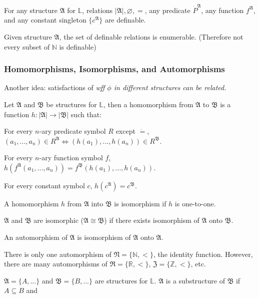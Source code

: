 \documentclass{article}
\begin{document}
	For any structure $\mathfrak{A}$ for $\mathbb{L}$, relations $|\mathfrak{A}|, \varnothing, =$, any predicate $\dot P^{\mathfrak{A}}$, any function $f^{\mathfrak{A}}$, and any constant singleton $\{c^{\mathfrak{A}}\}$ are definable.

\Lemma {} Given structure $\mathfrak{A}$, the set of definable relations is enumerable. (Therefore not every subset of $\mathbb{N}$ is definable)



\subsubsection{Homomorphisms, Isomorphisms, and Automorphisms}

Another idea: satisfactions of \it{wff} $\phi$ in different structures can be related.

	Let $\mathfrak{A}$ and $\mathfrak{B}$ be structures for $\mathbb{L}$, then a homomorphism from $\mathfrak{A}$ to $\mathfrak{B}$ is a function $h:|\mathfrak{A}|\to|\mathfrak{B}|$ such that:
	
	 For every $n$-ary predicate symbol $R$ except $\dot =$, $(a_1,...,a_n)\in R^{\mathfrak{A}} \Leftrightarrow (h(a_1),...,h(a_n)) \in R^{\mathfrak{B}}$.
	
	 For every $n$-ary function symbol $f$, $h(f^{\mathfrak{A}}(a_1,...,a_n))=f^{\mathfrak{B}}(h(a_1),...,h(a_n))$.
	
	 For every constant symbol $c$, $h(c^{\mathfrak{A}})=c^{\mathfrak{B}}$.

	A homomorphism $h$ from $\mathfrak{A}$ into $\mathfrak{B}$ is isomorphism if $h$ is one-to-one.

	$\mathfrak{A}$ and $\mathfrak{B}$ are isomorphic ($\mathfrak{A} \cong \mathfrak{B}$) if there exists isomorphism of $\mathfrak{A}$ onto $\mathfrak{B}$.
	
	An automorphism of $\mathfrak{A}$ is isomorphism of $\mathfrak{A}$ onto $\mathfrak{A}$.

\eg There is only one automorphism of $\mathfrak{N}=\{ \mathbb{N}, < \}$, the identity function. However, there are many automorphisms of $\mathfrak{R}=\{ \mathbb{R}, < \}$, $\mathfrak{Z}=\{ \mathbb{Z}, < \}$, etc.

	$\mathfrak{A}=\{A,...\}$ and $\mathfrak{B}=\{B,...\}$ are structures for $\mathbb{L}$. $\mathfrak{A}$ is a substructure of $\mathfrak{B}$ if $A \subseteq B$ and
	
\end{document}
